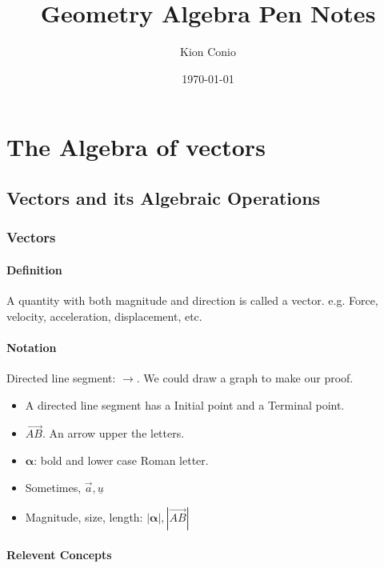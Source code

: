 \documentclass[UTF8]{ctexart}
\title{Geometry Algebra Pen Notes}
\author{Kion Conio}
\date{\today}
\begin{document}
\maketitle
\section{The Algebra of vectors}

\subsection{Vectors and its Algebraic Operations }

\subsubsection{Vectors}
\paragraph{Definition}
A quantity with both magnitude and direction is called a vector. e.g. Force, velocity, acceleration, displacement, etc.

\paragraph{Notation}
Directed line segment: $\rightarrow $. We could draw a graph to make our proof.


\begin{itemize}

\item A directed line segment has a Initial point and a Terminal point.  

\item $\overrightarrow{AB}$. An arrow upper the letters. 

\item $\bm \alpha$: bold and lower case Roman letter.  

\item Sometimes, $\vec a,\underline u$ 

\item Magnitude, size, length: $|\bm \alpha|,|\overrightarrow {AB}|$


\end{itemize}

\paragraph{Relevent Concepts} 
\end{document}
